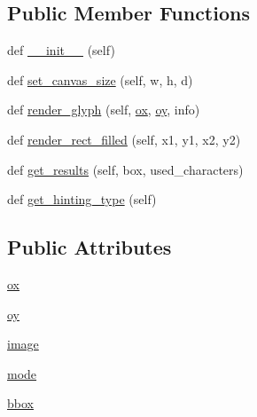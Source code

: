 \subsection*{Public Member Functions}
\begin{DoxyCompactItemize}
\item 
def \hyperlink{classmatplotlib_1_1mathtext_1_1MathtextBackendAgg_a0c14e65dbf336ad3dfc542b3e15a717c}{\+\_\+\+\_\+init\+\_\+\+\_\+} (self)
\item 
def \hyperlink{classmatplotlib_1_1mathtext_1_1MathtextBackendAgg_ac234ba725a34d24ebc89888d70f1a323}{set\+\_\+canvas\+\_\+size} (self, w, h, d)
\item 
def \hyperlink{classmatplotlib_1_1mathtext_1_1MathtextBackendAgg_afb45bbf28b30ff34388615a6cdba6c54}{render\+\_\+glyph} (self, \hyperlink{classmatplotlib_1_1mathtext_1_1MathtextBackendAgg_a4cd0827f2c54e3408536356b0dd9b6d2}{ox}, \hyperlink{classmatplotlib_1_1mathtext_1_1MathtextBackendAgg_af9d59fb4517c64445577482addb56ba9}{oy}, info)
\item 
def \hyperlink{classmatplotlib_1_1mathtext_1_1MathtextBackendAgg_ad9947ced759e1809ef01dc7899d0b9bb}{render\+\_\+rect\+\_\+filled} (self, x1, y1, x2, y2)
\item 
def \hyperlink{classmatplotlib_1_1mathtext_1_1MathtextBackendAgg_add33ffe6ca25ee9f60c01260d38825b5}{get\+\_\+results} (self, box, used\+\_\+characters)
\item 
def \hyperlink{classmatplotlib_1_1mathtext_1_1MathtextBackendAgg_a4ad7261bff033953b519ade61c5e372f}{get\+\_\+hinting\+\_\+type} (self)
\end{DoxyCompactItemize}
\subsection*{Public Attributes}
\begin{DoxyCompactItemize}
\item 
\hyperlink{classmatplotlib_1_1mathtext_1_1MathtextBackendAgg_a4cd0827f2c54e3408536356b0dd9b6d2}{ox}
\item 
\hyperlink{classmatplotlib_1_1mathtext_1_1MathtextBackendAgg_af9d59fb4517c64445577482addb56ba9}{oy}
\item 
\hyperlink{classmatplotlib_1_1mathtext_1_1MathtextBackendAgg_a888be91fcd92674d5de42c95a5edf2e6}{image}
\item 
\hyperlink{classmatplotlib_1_1mathtext_1_1MathtextBackendAgg_a3ada86c634fe46c8e5942d46281899b1}{mode}
\item 
\hyperlink{classmatplotlib_1_1mathtext_1_1MathtextBackendAgg_a83be04bae842575bc655343fdf588b25}{bbox}
\end{DoxyCompactItemize}


